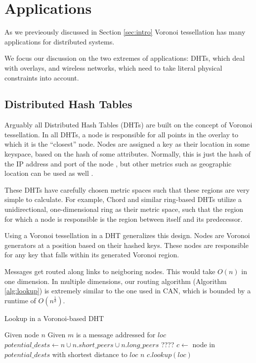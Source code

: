 \documentclass[11pt, conference, letterpaper]{IEEEtran}
\begin{document}
\section{Applications}
\label{sec:applications}

As we previeously discussed in Section \ref{sec:intro} Voronoi tessellation has many applications for distributed systems.

We focus our discussion on the two extremes of applications: DHTs, which deal with overlays, and wireless networks, which need to take literal physical constraints into account.

\subsection{Distributed Hash Tables}
Arguably all Distributed Hash Tables (DHTs) are built on the concept of Voronoi tessellation.
In all DHTs, a node is responsible for all points in the overlay to which it is the ``closest'' node.
Nodes are assigned a key as their location in some keyspace, based on the hash of some attributes.
Normally, this is just the hash of the IP address and port of the node  \cite{chord} \cite{kademlia} \cite{can} \cite{pastry}, but other metrics such as geographic location can be used as well \cite{ratnasamy2002ght}.

These DHTs have carefully chosen metric spaces such that these regions are very simple to calculate.
For example, Chord and similar ring-based DHTs utilize a unidirectional, one-dimensional ring as their metric space, such that the region for which a node is responsible is the region between itself and its predecessor.

Using a Voronoi tessellation in a DHT generalizes this design. 
Nodes are Voronoi generators at a position based on their hashed keys.
These nodes are responsible for any key that falls within its generated Voronoi region.

Messages get routed along links to neigboring nodes. 
This would take $O(n)$ in one dimension.
In multiple dimensions, our routing algorithm (Algorithm \ref{alg:lookup}) is extremely similar to the one used in CAN, which is bounded by a runtime of $O(n^{\frac{1}{d}})$.
\begin{algorithm}
	\caption{Lookup in a Voronoi-based DHT}
	\label{alg:lookup}
	\begin{algorithmic}[1] 
		\STATE Given node $n$
		\STATE Given $m$ is a message addressed for $loc$
		\STATE $potential\_dests \leftarrow n \cup n.short\_peers \cup n.long\_peers$ ????
		\STATE $c \leftarrow $ node in $ potential\_dests$ with shortest distance to $loc$
		\RETURN $n$
		\ELSE
		\RETURN $c.lookup(loc)$
		\ENDIF
	\end{algorithmic}
\end{algorithm}
\end{document}
